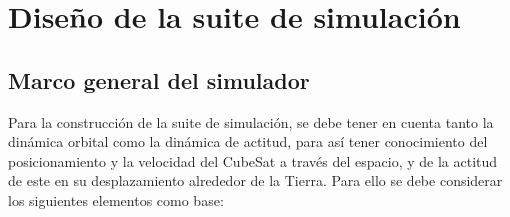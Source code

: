 \section{Diseño de la suite de simulación}

\subsection{Marco general del simulador}

Para la construcción de la suite de simulación, se debe tener en cuenta tanto la dinámica orbital como la dinámica de actitud, para así tener conocimiento del posicionamiento y la velocidad del CubeSat a través del espacio, y de la actitud de este en su desplazamiento alrededor de la Tierra. Para ello se debe considerar los siguientes elementos como base:

